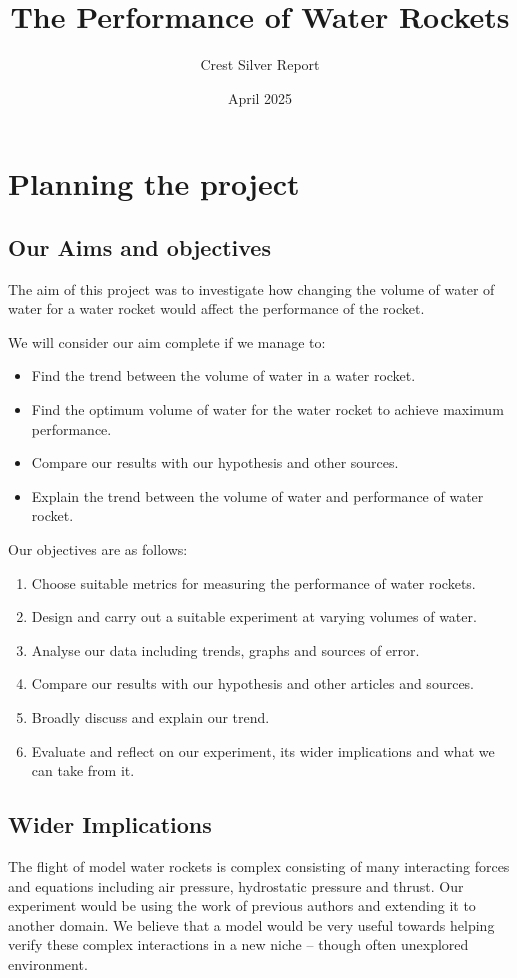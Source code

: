 \documentclass[14pt]{article}
\title{The Performance of Water Rockets}
\author{Crest Silver Report}
\date{April 2025}
\begin{document}

\maketkitle
\tableofcontents
\section{Planning the project}
\subsection{Our Aims and objectives}

The aim of this project was to investigate how changing the volume of water of water for a water rocket would affect the performance of the rocket.

We will consider our aim complete if we manage to:
\begin{itemize}
    \item Find the trend between the volume of water in a water rocket.
    \item Find the optimum volume of water for the water rocket to achieve maximum performance.
    \item Compare our results with our hypothesis and other sources.
    \item Explain the trend between the volume of water and performance of water rocket.
\end{itemize}
Our objectives are as follows:
\begin{enumerate}
    \item Choose suitable metrics for measuring the performance of water rockets.
    \item Design and carry out a suitable experiment at varying volumes of water.
    \item Analyse our data including trends, graphs and sources of error.
    \item Compare our results with our hypothesis and other articles and sources.
    \item Broadly discuss and explain our trend.
    \item Evaluate and reflect on our experiment, its wider implications and what we can take from it.
\end{enumerate}
\subsection{Wider Implications}
The flight of model water rockets is complex consisting of many interacting forces and equations including air pressure, hydrostatic pressure and thrust. Our experiment would be using the work of previous authors and extending it to another domain. We believe that a model would be very useful towards helping verify these complex interactions in a new niche -- though often unexplored environment.
\end{document}
